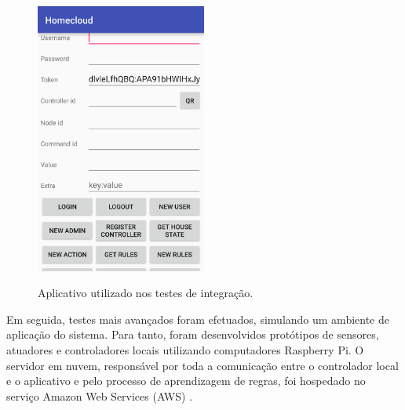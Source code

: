 \begin{figure}[h]
	\centering
	\caption{Aplicativo utilizado nos testes de integração.}
  \includegraphics[width=0.5\textwidth]{imagens/aplicativo_teste.png}
  \label{fig:aplicativo_teste}  
\end{figure}

Em seguida, testes mais avançados foram efetuados, simulando um ambiente de aplicação do sistema. Para tanto, foram desenvolvidos protótipos de sensores, atuadores e controladores locais utilizando computadores Raspberry Pi. O servidor em nuvem, responsável por toda a comunicação entre o controlador local e o aplicativo e pelo processo de aprendizagem de regras, foi hospedado no serviço Amazon Web Services (AWS) .